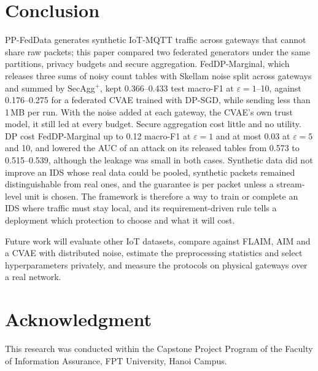 \documentclass[conference]{IEEEtran}
\begin{document}
\section{Conclusion}\label{sec:conclusion}
PP-FedData generates synthetic IoT-MQTT traffic across gateways that cannot share raw packets; this paper compared two federated generators under the same partitions, privacy budgets and secure aggregation. FedDP-Marginal, which releases three sums of noisy count tables with Skellam noise split across gateways and summed by SecAgg$^+$, kept 0.366--0.433 test macro-F1 at $\varepsilon = 1$--10, against 0.176--0.275 for a federated CVAE trained with DP-SGD, while sending less than 1\,MB per run. With the noise added at each gateway, the CVAE's own trust model, it still led at every budget. Secure aggregation cost little and no utility. DP cost FedDP-Marginal up to 0.12 macro-F1 at $\varepsilon = 1$ and at most 0.03 at $\varepsilon = 5$ and 10, and lowered the AUC of an attack on its released tables from 0.573 to 0.515--0.539, although the leakage was small in both cases. Synthetic data did not improve an IDS whose real data could be pooled, synthetic packets remained distinguishable from real ones, and the guarantee is per packet unless a stream-level unit is chosen. The framework is therefore a way to train or complete an IDS where traffic must stay local, and its requirement-driven rule tells a deployment which protection to choose and what it will cost.

Future work will evaluate other IoT datasets, compare against FLAIM, AIM and a CVAE with distributed noise, estimate the preprocessing statistics and select hyperparameters privately, and measure the protocols on physical gateways over a real network.

\section*{Acknowledgment}
This research was conducted within the Capstone Project Program of the Faculty of Information Assurance, FPT University, Hanoi Campus.



\end{document}
